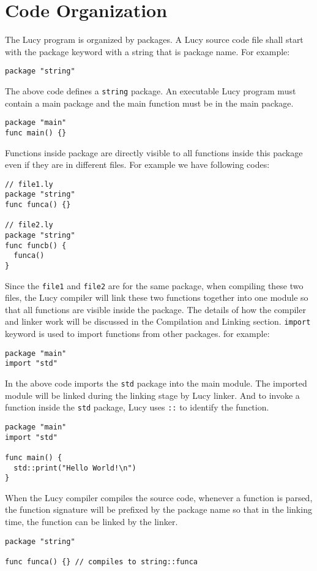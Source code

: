 \section{Code Organization}
The Lucy program is organized by packages. A Lucy source code file shall start with the package keyword with a string that is package name. For example:
\begin{lstlisting}
package "string"
\end{lstlisting}
The above code defines a \texttt{string} package. An executable Lucy program must contain a main package and the main function must be in the main package.
\begin{lstlisting}
package "main"
func main() {}
\end{lstlisting}
Functions inside package are directly visible to all functions inside this package even if they are in different files. For example we have following codes:
\begin{lstlisting}
// file1.ly
package "string"
func funca() {}

// file2.ly
package "string"
func funcb() {
  funca()
}
\end{lstlisting}
Since the \texttt{file1} and \texttt{file2} are for the same package, when compiling these two files, the Lucy compiler will link these two functions together into one module so that all functions are visible inside the package. The details of how the compiler and linker work will be discussed in the Compilation and Linking section.
\texttt{import} keyword is used to import functions from other packages. for example:
\begin{lstlisting}
package "main"
import "std"
\end{lstlisting}
In the above code imports the \texttt{std} package into the main module. The imported module will be linked during the linking stage by Lucy linker. And to invoke a function inside the \texttt{std} package, Lucy uses \texttt{::} to identify the function.
\begin{lstlisting}
package "main"
import "std"

func main() {
  std::print("Hello World!\n")
}
\end{lstlisting}
When the Lucy compiler compiles the source code, whenever a function is parsed, the function signature will be prefixed by the package name so that in the linking time, the function can be linked by the linker.
\begin{lstlisting}
package "string"

func funca() {} // compiles to string::funca
\end{lstlisting}

